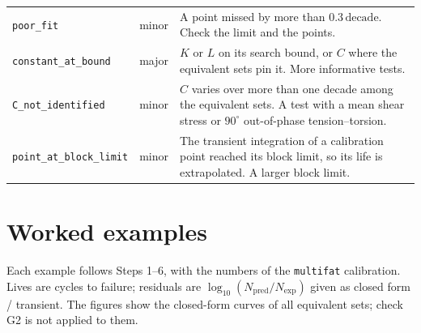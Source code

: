 \documentclass[11pt,a4paper]{article}
\newcommand{\dec}{\,\text{decade}}
\newcommand{\code}[1]{\texttt{#1}}
\begin{document}
\begin{table}[htbp]
\begin{tabularx}{\textwidth}{
    @{}
    >{\raggedright\arraybackslash}p{}
    >{\centering\arraybackslash}p{}
    >{\raggedright\arraybackslash}X
    @{}
}
\code{poor\_fit} & minor & A point missed by more than $0.3\dec$. Check the limit and the points. \\
\code{constant\_at\_bound} & major & $K$ or $L$ on its search bound, or $C$ where the equivalent sets pin it. More
informative tests. \\
\code{C\_not\_identified} & minor & $C$ varies over more than one decade among the equivalent sets. A test with a mean
shear stress or $90^\circ$ out-of-phase tension--torsion. \\
\code{point\_at\_block\_limit} & minor & The transient integration of a calibration point reached its block limit, so
its life is extrapolated. A larger block limit. \\
\bottomrule
\end{tabularx}
\end{table}

\FloatBarrier
\section{Worked examples}\label{sec:examples}
Each example follows Steps 1--6, with the numbers of the \texttt{multifat} calibration. Lives are cycles to failure;
residuals are $\log_{10}(N_\text{pred}/N_\text{exp})$ given as closed form / transient. The figures show the
closed-form curves of all equivalent sets; check G2 is not applied to them.

\end{document}
